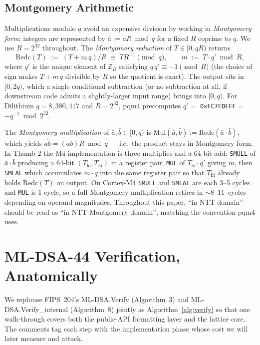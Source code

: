 \documentclass[11pt,a4paper]{article}
\newcommand{\Z}{\mathbb{Z}}
\begin{document}
\subsection{Montgomery Arithmetic}

Multiplications modulo $q$ avoid an expensive division by working in
\emph{Montgomery form}: integers are represented by $\bar a := a R \bmod
q$ for a fixed $R$ coprime to $q$. We use $R = 2^{32}$ throughout. The
\emph{Montgomery reduction} of $T \in [0, qR)$ returns
\[
  \mathrm{Redc}(T) \;:=\; (T + m\,q)/R \;\equiv\; T R^{-1} \pmod q,
  \qquad m \;:=\; T \cdot q' \bmod R,
\]
where $q'$ is the unique element of $\Z_R$ satisfying $q\,q' \equiv -1
\pmod R$ (the choice of sign makes $T + m\,q$ divisible by $R$ so the
quotient is exact). The output sits in $[0, 2q)$, which a single
conditional subtraction (or no subtraction at all, if downstream code
admits a slightly-larger input range) brings into $[0, q)$. For Dilithium
$q = 8{,}380{,}417$ and $R = 2^{32}$, pqm4 precomputes $q' = $
\texttt{0xFC7FDFFF} = $-q^{-1} \bmod 2^{32}$.

The \emph{Montgomery multiplication} of $\bar a, \bar b \in [0, q)$ is
$\mathrm{Mul}(\bar a, \bar b) := \mathrm{Redc}(\bar a \cdot \bar b)$,
which yields $\overline{ab} = (ab)R \bmod q$ --- i.e.\ the product
stays in Montgomery form. In Thumb-2 the M4 implementation is three
multiplies and a 64-bit add: \texttt{SMULL} of $\bar a \cdot \bar b$
producing a 64-bit $(T_{\text{lo}}, T_{\text{hi}})$ in a register pair,
\texttt{MUL} of $T_{\text{lo}} \cdot q'$ giving $m$, then \texttt{SMLAL}
which accumulates $m \cdot q$ into the same register pair so that
$T_{\text{hi}}$ already holds $\mathrm{Redc}(T)$ on output. On Cortex-M4
\texttt{SMULL} and \texttt{SMLAL} are each 3--5 cycles and \texttt{MUL}
is 1 cycle, so a full Montgomery multiplication retires in
$\sim$$8$--$11$~cycles depending on operand magnitudes. Throughout this
paper, ``in NTT domain'' should be read as ``in NTT-Montgomery domain'',
matching the convention pqm4 uses.

\section{ML-DSA-44 Verification, Anatomically}
\label{sec:verify-anatomy}

We rephrase FIPS~204's ML-DSA.Verify (Algorithm~3) and
ML-DSA.Verify\_internal (Algorithm~8) jointly as Algorithm~\ref{alg:verify}
so that one walk-through covers both the public-API formatting layer and
the lattice core. The comments tag each step with the implementation
phase whose cost we will later measure and attack.
\end{document}
